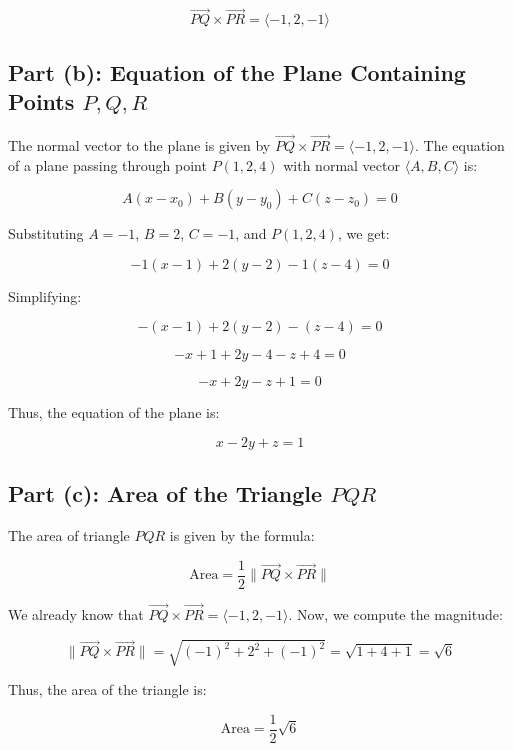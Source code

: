 \documentclass[11pt]{article}
\begin{document}
\[
\overrightarrow{PQ} \times \overrightarrow{PR} = \langle -1, 2, -1 \rangle
\]

\newpage

\subsection{Part (b): Equation of the Plane Containing Points $P, Q, R$}

The normal vector to the plane is given by $\overrightarrow{PQ} \times \overrightarrow{PR} = \langle -1, 2, -1 \rangle$. The equation of a plane passing through point $P(1, 2, 4)$ with normal vector $\langle A, B, C \rangle$ is:

\[
A(x - x_0) + B(y - y_0) + C(z - z_0) = 0
\]

Substituting $A = -1$, $B = 2$, $C = -1$, and $P(1, 2, 4)$, we get:

\[
-1(x - 1) + 2(y - 2) - 1(z - 4) = 0
\]

Simplifying:

\[
-(x - 1) + 2(y - 2) - (z - 4) = 0
\]

\[
-x + 1 + 2y - 4 - z + 4 = 0
\]

\[
-x + 2y - z + 1 = 0
\]

Thus, the equation of the plane is:

\[
x - 2y + z = 1
\]

\newpage

\subsection{Part (c): Area of the Triangle $PQR$}

The area of triangle $PQR$ is given by the formula:

\[
\text{Area} = \frac{1}{2} \|\overrightarrow{PQ} \times \overrightarrow{PR}\|
\]

We already know that $\overrightarrow{PQ} \times \overrightarrow{PR} = \langle -1, 2, -1 \rangle$. Now, we compute the magnitude:

\[
\|\overrightarrow{PQ} \times \overrightarrow{PR}\| = \sqrt{(-1)^2 + 2^2 + (-1)^2} = \sqrt{1 + 4 + 1} = \sqrt{6}
\]

Thus, the area of the triangle is:

\[
\text{Area} = \frac{1}{2} \sqrt{6}
\]
\end{document}
